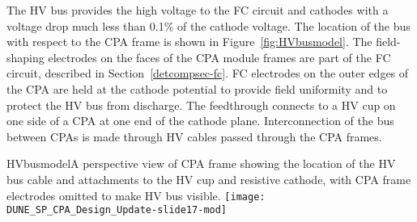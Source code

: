 The HV bus provides the high voltage to the FC
circuit and cathodes with a voltage drop much less than 0.1\% of the
cathode voltage. The location of the bus with respect to the CPA frame is shown in Figure~\ref{fig:HVbusmodel}. The field-shaping electrodes on the faces of the CPA module
frames are part of the FC circuit, described in Section~\ref{detcompsec-fc}. 
FC electrodes on the outer edges of the
CPA are held at the cathode potential to provide field
uniformity and to protect the HV bus from discharge.  The feedthrough
connects to a HV cup on one side of a CPA at one end of
the cathode plane.  Interconnection of the bus between CPAs is made
through HV cables passed through the CPA frames. 

\begin{cdrfigure}{HVbusmodel}{A perspective view of CPA frame showing the location of the HV bus cable and attachments to the HV cup and resistive cathode, with CPA frame electrodes omitted to make HV bus visible.}
\texttt{[image: DUNE\_SP\_CPA\_Design\_Update-slide17-mod]}
\end{cdrfigure}


